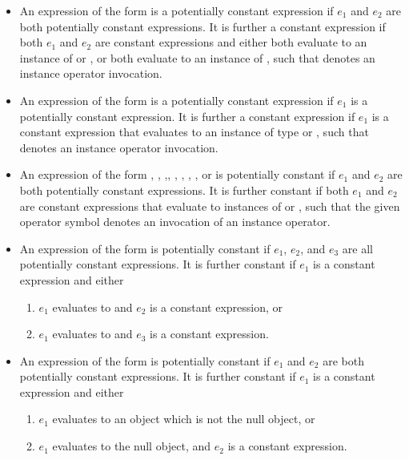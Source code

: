 \documentclass[makeidx]{article}
\begin{document}
{\begin{itemize}
\item An expression of the form  is
  a potentially constant expression if $e_1$ and $e_2$
  are both potentially constant expressions.
  It is further a constant expression
  if both $e_1$ and $e_2$ are constant expressions
  and either both evaluate to an instance of  or ,
  or both evaluate to an instance of ,
  such that \lit{+} denotes an instance operator invocation.

\item
  An expression of the form  is a potentially constant expression
  if $e_1$ is a potentially constant expression.
  It is further a constant expression if $e_1$ is a constant expression that
  evaluates to an instance of type  or ,
  such that \lit{-} denotes an instance operator invocation.

\item An expression of the form , ,
  ,, ,
  , , , or
  is potentially constant
  if $e_1$ and $e_2$ are both potentially constant expressions.
  It is further constant if both $e_1$ and $e_2$ are constant expressions that
  evaluate to instances of  or ,
  such that the given operator symbol denotes
  an invocation of an instance operator.

\item An expression of the form 
  is potentially constant if $e_1$, $e_2$, and $e_3$
  are all potentially constant expressions.
  It is further constant if $e_1$ is a constant expression and either
  \begin{enumerate}
  \item $e_1$ evaluates to \TRUE{} and $e_2$ is a constant expression, or
  \item $e_1$ evaluates to \FALSE{} and $e_3$ is a constant expression.
  \end{enumerate}

\item An expression of the form  is potentially constant
  if $e_1$ and $e_2$ are both potentially constant expressions.
  It is further constant if $e_1$ is a constant expression and either
  \begin{enumerate}
  \item $e_1$ evaluates to an object which is not the null object, or
  \item $e_1$ evaluates to the null object, and $e_2$ is a constant expression.
  \end{enumerate}


\end{itemize}}
\end{document}
